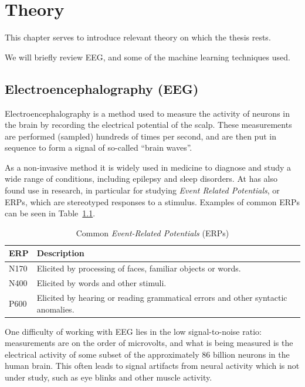 \chapter{Theory}

This chapter serves to introduce relevant theory on which the thesis rests. 

We will briefly review EEG, and some of the machine learning techniques used.

\section{Electroencephalography (EEG)}\label{eeg-theory}

    Electroencephalography is a method used to measure the activity of neurons in the brain by recording the electrical potential of the scalp. These measurements are performed (sampled) hundreds of times per second, and are then put in sequence to form a signal of so-called ``brain waves''. 

    As a non-invasive method it is widely used in medicine to diagnose and study a wide range of conditions, including epilepsy and sleep disorders. 
    At has also found use in research, in particular for studying \emph{Event Related Potentials}, or ERPs, which are stereotyped responses to a stimulus. Examples of common ERPs can be seen in Table~\ref{table:erps}.

    \begin{table}
        \begin{tabular}{ll}
            \toprule
            ERP & Description
            \\
            \midrule
            N170 & Elicited by processing of faces, familiar objects or words.
            \\
            N400 & Elicited by words and other stimuli.
            \\
            P600 & Elicited by hearing or reading grammatical errors and other syntactic anomalies.
            \\
            \bottomrule
        \end{tabular}
        \caption{Common \emph{Event-Related Potentials} (ERPs)}\label{table:erps}
    \end{table}

    One difficulty of working with EEG lies in the low signal-to-noise ratio: measurements are on the order of microvolts, and what is being measured is the electrical activity of some subset of the approximately 86 billion neurons in the human brain. This often leads to signal artifacts from neural activity which is not under study, such as eye blinks and other muscle activity.

